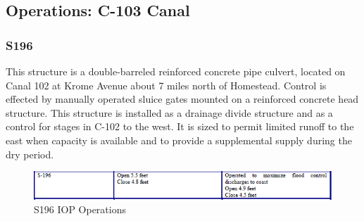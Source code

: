 \clearpage
\subsection{Operations: C-103 Canal}

\subsubsection{S196}
This structure is a double-barreled reinforced concrete pipe culvert, located on Canal 102 at Krome Avenue about 7 miles north of Homestead. Control is effected by manually operated sluice gates mounted on a reinforced concrete head structure. This structure is installed as a drainage divide structure and as a control for stages in C-102 to the west. It is sized to permit limited runoff to the east when capacity is available and to provide a supplemental supply during the dry period.
%
%

\begin{figure}[!h]
  \begin{center}
  \includegraphics[width=6.5in]{../figs/S196_IOPops.png}
  \caption{S196 IOP Operations}
  \label{fig:S196iop}
  \end{center}
\end{figure}

